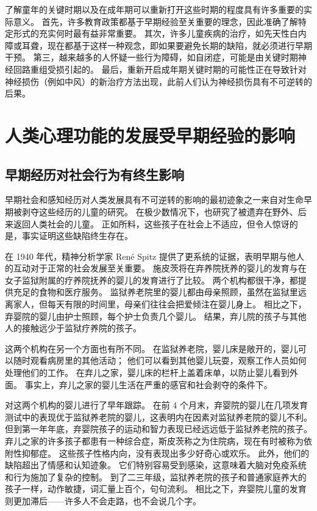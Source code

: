 了解童年的关键时期以及在成年期可以重新打开这些时期的程度具有许多重要的实际意义。 首先，许多教育政策都基于早期经验至关重要的理念，因此准确了解特定形式的充实何时最有益非常重要。 其次，许多儿童疾病的治疗，如先天性白内障或耳聋，现在都基于这样一种观念，即如果要避免长期的缺陷，就必须进行早期干预。 第三，越来越多的人怀疑一些行为障碍，如自闭症，可能是由关键时期神经回路重组受损引起的。 最后，重新开启成年期关键时期的可能性正在导致针对神经损伤（例如中风）的新治疗方法出现，此前人们认为神经损伤具有不可逆转的后果。

\section{人类心理功能的发展受早期经验的影响}
\subsection{早期经历对社会行为有终生影响}
早期社会和感知经历对人类发展具有不可逆转的影响的最初迹象之一来自对生命早期被剥夺这些经历的儿童的研究。 在极少数情况下，也研究了被遗弃在野外、后来返回人类社会的儿童。 正如所料，这些孩子在社会上不适应，但令人惊讶的是，事实证明这些缺陷终生存在。

在 1940 年代，精神分析学家 René Spitz 提供了更系统的证据，表明早期与他人的互动对于正常的社会发展至关重要。 施皮茨将在弃养院抚养的婴儿的发育与在女子监狱附属的疗养院抚养的婴儿的发育进行了比较。 两个机构都很干净，都提供充足的食物和医疗服务。 监狱养老院里的婴儿都由母亲照顾，虽然在监狱里远离家人，但每天有限的时间里，母亲们往往会把爱倾注在婴儿身上。 相比之下，弃婴院的婴儿由护士照顾，每个护士负责几个婴儿。 结果，弃儿院的孩子与其他人的接触远少于监狱疗养院的孩子。

这两个机构在另一个方面也有所不同。 在监狱养老院，婴儿床是敞开的，婴儿可以随时观看病房里的其他活动； 他们可以看到其他婴儿玩耍，观察工作人员如何处理他们的工作。 在弃儿之家，婴儿床的栏杆上盖着床单，以防止婴儿看到外面。 事实上，弃儿之家的婴儿生活在严重的感官和社会剥夺的条件下。

对这两个机构的婴儿进行了早年跟踪。 在前 4 个月末，弃婴院的婴儿在几项发育测试中的表现优于监狱养老院的婴儿，这表明内在因素对监狱养老院的婴儿不利。 但到第一年年底，弃婴院孩子的运动和智力表现已经远远低于监狱养老院的孩子。 弃儿之家的许多孩子都患有一种综合症，斯皮茨称之为住院病，现在有时被称为依附性抑郁症。 这些孩子性格内向，没有表现出多少好奇心或欢乐。 此外，他们的缺陷超出了情感和认知迹象。 它们特别容易受到感染，这意味着大脑对免疫系统和行为施加了复杂的控制。 到了二三年级，监狱养老院的孩子和普通家庭养大的孩子一样，动作敏捷，词汇量上百个，句句流利。 相比之下，弃婴院儿童的发育则更加滞后——许多人不会走路，也不会说几个字。

